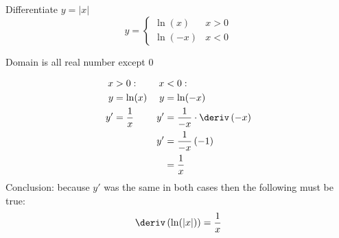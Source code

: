 \begin{example}
    Differentiate $y = \left|x\right|$
    \begin{equation*}
        y = \begin{cases}
            \ln(x) & x > 0 \\
            \ln(-x) & x < 0
        \end{cases}
    \end{equation*}
    \begin{note}
        Domain is all real number except 0
    \end{note}
    \begin{align*}
        x  &> 0:           & x &< 0: \\
        y  &= \ln(x)       & y &= \ln(-x) \\
        y' &= \dfrac{1}{x} & y' &= \dfrac{1}{-x} \cdot \deriv \left(-x\right) \\
           &               & y' &= \dfrac{1}{-x} \left(-1\right) \\
           &               &    &= \dfrac{1}{x}
    \end{align*}
    Conclusion: because $y'$ was the same in both cases then the following must be true:
    \begin{equation*}
        \deriv\left(\ln(\left|x\right|)\right) = \dfrac{1}{x}
    \end{equation*}
\end{example}
